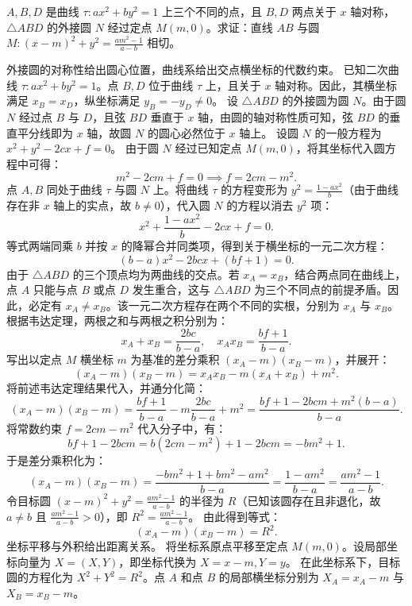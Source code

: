 \begin{example}
$A,B,D$ 是曲线 $\tau: ax^2 + by^2 = 1$ 上三个不同的点，且 $B,D$ 两点关于 $x$ 轴对称，$\triangle ABD$ 的外接圆 $N$ 经过定点 $M(m,0)$。求证：直线 $AB$ 与圆 $M: (x - m)^2 + y^2 = \frac{am^2 - 1}{a - b}$ 相切。
\end{example}
\begin{solution}
外接圆的对称性给出圆心位置，曲线系给出交点横坐标的代数约束。
已知二次曲线 $\tau: ax^2 + by^2 = 1$。点 $B, D$ 位于曲线 $\tau$ 上，且关于 $x$ 轴对称。因此，其横坐标满足 $x_B = x_D$，纵坐标满足 $y_B = -y_D \neq 0$。
设 $\triangle ABD$ 的外接圆为圆 $N$。由于圆 $N$ 经过点 $B$ 与 $D$，且弦 $BD$ 垂直于 $x$ 轴，由圆的轴对称性质可知，弦 $BD$ 的垂直平分线即为 $x$ 轴，故圆 $N$ 的圆心必然位于 $x$ 轴上。
设圆 $N$ 的一般方程为 $x^2 + y^2 - 2cx + f = 0$。
由于圆 $N$ 经过已知定点 $M(m,0)$，将其坐标代入圆方程中可得：
\[
m^2 - 2cm + f = 0 \implies f = 2cm - m^2.
\]
点 $A, B$ 同处于曲线 $\tau$ 与圆 $N$ 上。将曲线 $\tau$ 的方程变形为 $y^2 = \frac{1 - ax^2}{b}$（由于曲线存在非 $x$ 轴上的实点，故 $b \neq 0$），代入圆 $N$ 的方程以消去 $y^2$ 项：
\[
x^2 + \frac{1 - ax^2}{b} - 2cx + f = 0.
\]
等式两端同乘 $b$ 并按 $x$ 的降幂合并同类项，得到关于横坐标的一元二次方程：
\[
(b - a)x^2 - 2bc x + (bf + 1) = 0.
\]
由于 $\triangle ABD$ 的三个顶点均为两曲线的交点。若 $x_A = x_B$，结合两点同在曲线上，点 $A$ 只能与点 $B$ 或点 $D$ 发生重合，这与 $\triangle ABD$ 为三个不同点的前提矛盾。因此，必定有 $x_A \neq x_B$。该一元二次方程存在两个不同的实根，分别为 $x_A$ 与 $x_B$。
根据韦达定理，两根之和与两根之积分别为：
\[
x_A + x_B = \frac{2bc}{b - a}, \quad x_A x_B = \frac{bf + 1}{b - a}.
\]
写出以定点 $M$ 横坐标 $m$ 为基准的差分乘积 $(x_A - m)(x_B - m)$，并展开：
\[
(x_A - m)(x_B - m) = x_A x_B - m(x_A + x_B) + m^2.
\]
将前述韦达定理结果代入，并通分化简：
\[
(x_A - m)(x_B - m) = \frac{bf + 1}{b - a} - m \frac{2bc}{b - a} + m^2 = \frac{bf + 1 - 2bcm + m^2(b - a)}{b - a}.
\]
将常数约束 $f = 2cm - m^2$ 代入分子中，有：
\[
bf + 1 - 2bcm = b(2cm - m^2) + 1 - 2bcm = -bm^2 + 1.
\]
于是差分乘积化为：
\[
(x_A - m)(x_B - m) = \frac{-bm^2 + 1 + bm^2 - am^2}{b - a} = \frac{1 - am^2}{b - a} = \frac{am^2 - 1}{a - b}.
\]
令目标圆 $(x - m)^2 + y^2 = \frac{am^2 - 1}{a - b}$ 的半径为 $R$（已知该圆存在且非退化，故 $a \neq b$ 且 $\frac{am^2 - 1}{a - b} > 0$），即 $R^2 = \frac{am^2 - 1}{a - b}$。
由此得到等式：
\[
(x_A - m)(x_B - m) = R^2.
\]
坐标平移与外积给出距离关系。
将坐标系原点平移至定点 $M(m,0)$。设局部坐标向量为 $X = (X, Y)$，即坐标代换为 $X = x - m, Y = y$。
在此坐标系下，目标圆的方程化为 $X^2 + Y^2 = R^2$。点 $A$ 和点 $B$ 的局部横坐标分别为 $X_A = x_A - m$ 与 $X_B = x_B - m$。

\end{solution}
